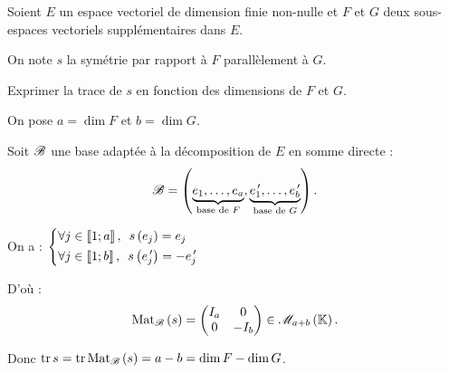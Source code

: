 \begin{exoex}
Soient \(E\) un espace vectoriel de dimension finie non-nulle et \(F\) et \(G\) deux sous-espaces vectoriels supplémentaires dans \(E\).

On note \(s\) la symétrie par rapport à \(F\) parallèlement à \(G\).

Exprimer la trace de \(s\) en fonction des dimensions de \(F\) et \(G\).
\end{exoex}

\begin{corr}
On pose \(a=\dim F\) et \(b=\dim G\).

Soit \(\mathscr{B}\) une base adaptée à la décomposition de \(E\) en somme directe : \[\mathscr{B}=\left(\underbrace{e_1,\dots,e_a}_{\text{base de }F},\underbrace{e_1^{\,\prime},\dots,e_b^{\,\prime}}_{\text{base de }G}\right).\]

On a : \(\begin{dcases}
\quantifs{\forall j\in\interventierii{1}{a}}s\paren{e_j}=e_j \\
\quantifs{\forall j\in\interventierii{1}{b}}s\paren{e_j\prim}=-e_j\prim
\end{dcases}\)

D'où : \[\Mat{s}=\begin{pmatrix}
I_a & 0 \\
0 & -I_b
\end{pmatrix}\in\M{a+b}.\]

Donc \(\tr s=\tr\Mat{s}=a-b=\dim F-\dim G\).
\end{corr}